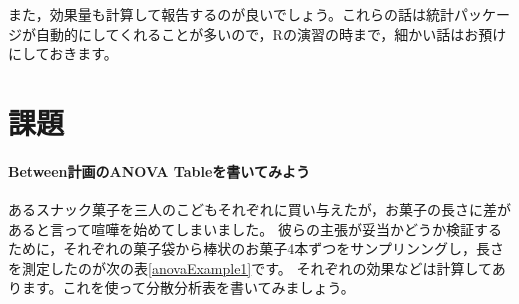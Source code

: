 \documentclass{ltjbook}
\begin{document}
また，効果量も計算して報告するのが良いでしょう。これらの話は統計パッケージが自動的にしてくれることが多いので，Rの演習の時まで，細かい話はお預けにしておきます。
\section{課題}

\paragraph{Between計画のANOVA Tableを書いてみよう}あるスナック菓子を三人のこどもそれぞれに買い与えたが，お菓子の長さに差があると言って喧嘩を始めてしまいました。
彼らの主張が妥当かどうか検証するために，それぞれの菓子袋から棒状のお菓子4本ずつをサンプリンングし，長さを測定したのが次の表\ref{anovaExample1}です。
それぞれの効果などは計算してあります。これを使って分散分析表を書いてみましょう。
\end{document}
